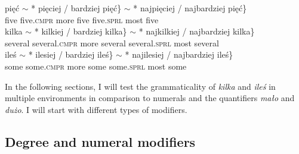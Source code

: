 \documentclass[output=paper, newtxmath, colorlinks, citecolor=brown]{langsci/langscibook}
\begin{document}
	\ea \label{ex:comparison-cardinals} \ea \gll pięć $\sim$ *\hspace{-2pt} \minsp{\{} pięciej / bardziej pięć\} $\sim$ *\hspace{-2pt} \minsp{\{} najpięciej / najbardziej {pięć\}}\\
	five {} {} {} five.\textsc{cmpr} {} more five {} {} {} five.\textsc{sprl} {} most five\\
	\ex \gll kilka $\sim$ *\hspace{-2pt} \minsp{\{} kilkiej / bardziej {kilka\}} $\sim$ *\hspace{-2pt} \minsp{\{} najkilkiej / najbardziej {kilka\}}\\
	several {} {} {} several.\textsc{cmpr} {} more several {} {} {} several.\textsc{sprl} {} most several\\
	\ex \gll ileś $\sim$ *\hspace{-2pt} \minsp{\{} ilesiej / bardziej {ileś\}} $\sim$ *\hspace{-2pt} \minsp{\{} najilesiej / najbardziej {ileś\}}\\
	some {} {} {} some.\textsc{cmpr} {} more some {} {} {} some.\textsc{sprl} {} most some\\
	\z
    \z

	\noindent In the following sections, I will test the grammaticality of \textit{kilka} and \textit{ileś} in multiple environments in comparison to  numerals and the quantifiers \textit{mało} and \textit{dużo}. I will start with different types of modifiers.

	\subsection{Degree and numeral modifiers}\label{sec:degree-and-numeral-modifiers}
\end{document}
